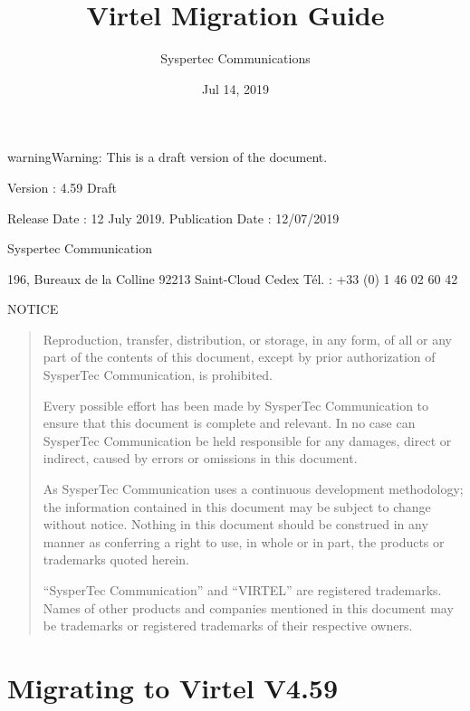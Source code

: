 \documentclass[letterpaper,10pt,english]{sphinxmanual}
\title{Virtel Migration Guide}
\date{Jul 14, 2019}
\author{Syspertec Communications}
\begin{document}
\pagestyle{empty}
\sphinxmaketitle
\pagestyle{plain}
\sphinxtableofcontents
\pagestyle{normal}
\label{\detokenize{Migration_Guide::doc}}



\begin{sphinxadmonition}{warning}{Warning:}
This is a draft version of the document.
\end{sphinxadmonition}

Version : 4.59 Draft

Release Date : 12 July 2019. Publication Date : 12/07/2019

Syspertec Communication

196, Bureaux de la Colline 92213 Saint-Cloud Cedex Tél. : +33 (0) 1 46 02 60 42


NOTICE
\begin{quote}

Reproduction, transfer, distribution, or storage, in any form, of all or any part of
the contents of this document, except by prior authorization of SysperTec
Communication, is prohibited.

Every possible effort has been made by SysperTec Communication to ensure that this document
is complete and relevant. In no case can SysperTec Communication be held responsible for
any damages, direct or indirect, caused by errors or omissions in this document.

As SysperTec Communication uses a continuous development methodology; the information
contained in this document may be subject to change without notice. Nothing in this
document should be construed in any manner as conferring a right to use, in whole or in
part, the products or trademarks quoted herein.

“SysperTec Communication” and “VIRTEL” are registered trademarks. Names of other products
and companies mentioned in this document may be trademarks or registered trademarks of
their respective owners.
\end{quote}

\newpage

\ignorespaces 

\chapter{Migrating to Virtel V4.59}
\label{\detokenize{Migration_Guide:migrating-to-virtel-v4-59}}\label{\detokenize{Migration_Guide:v459mi-introduction}}\label{\detokenize{Migration_Guide:index-0}}
\end{document}

